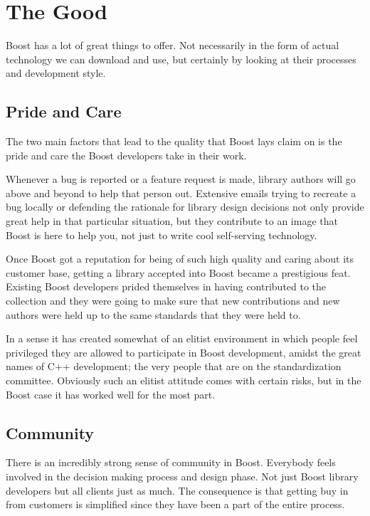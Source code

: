 \documentclass[twocolumn]{paper}
\begin{document}
\section{The Good}

Boost has a lot of great things to offer. Not necessarily in the
form of actual technology we can download and use, but certainly by
looking at their processes and development style.

\subsection{Pride and Care}

The two main factors that lead to the quality that Boost lays claim
on is the pride and care the Boost developers take in their work.

Whenever a bug is reported or a feature request is made, library
authors will go above and beyond to help that person out. Extensive
emails trying to recreate a bug locally or defending the rationale
for library design decisions not only provide great help in that
particular situation, but they contribute to an image that Boost is
here to help you, not just to write cool self-serving technology.

Once Boost got a reputation for being of such high quality and
caring about its customer base, getting a library accepted into
Boost became a prestigious feat. Existing Boost developers prided
themselves in having contributed to the collection and they were
going to make sure that new contributions and new authors were held
up to the same standards that they were held to.

In a sense it has created somewhat of an elitist environment in
which people feel privileged they are allowed to participate in
Boost development, amidst the great names of C++ development; the
very people that are on the standardization committee. Obviously
such an elitist attitude comes with certain risks, but in the Boost
case it has worked well for the most part.

\subsection{Community}

There is an incredibly strong sense of community in Boost. Everybody
feels involved in the decision making process and design phase. Not
just Boost library developers but all clients just as much. The
consequence is that getting buy in from customers is simplified
since they have been a part of the entire process.
\end{document}
